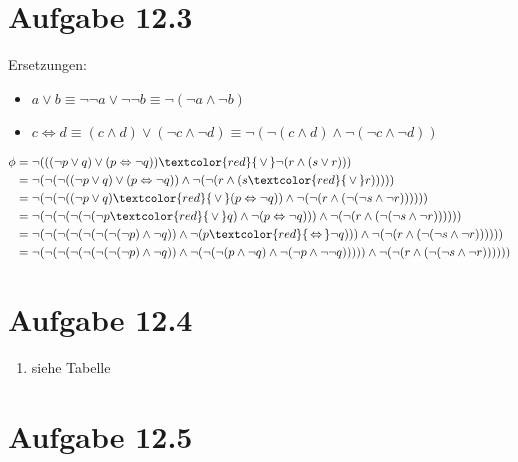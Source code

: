 \documentclass{article}
\begin{document}
	\section*{Aufgabe 12.3}
	Ersetzungen:
	\begin{itemize}
		\item $a\lor b\equiv \neg\neg a\lor\neg\neg b\equiv\neg(\neg a\land\neg b)$
		\item $c\Leftrightarrow d\equiv (c\land d)\lor(\neg c\land\neg d) \equiv \neg(\neg (c\land d)\land\neg (\neg c\land\neg d))$
	\end{itemize}
	\begin{align}
		\phi &= \neg(((\neg p\lor q)\lor(p\Leftrightarrow\neg q))\textcolor{red}{\,\lor\,}\neg(r\land(s\lor r))) \notag \\
		&= \neg(\neg(\neg ((\neg p\lor q)\lor(p\Leftrightarrow\neg q))\land\neg(\neg(r\land(s\textcolor{red}{\,\lor\,} r))))) \notag \\
		&= \neg(\neg(\neg ((\neg p\lor q)\textcolor{red}{\,\lor\,}(p\Leftrightarrow\neg q))\land\neg(\neg(r\land(\neg(\neg s\land\neg r)))))) \notag \\
		&= \neg(\neg(\neg (\neg(\neg (\neg p\textcolor{red}{\,\lor\,} q)\land\neg (p\Leftrightarrow\neg q)))\land\neg(\neg(r\land(\neg(\neg s\land\neg r)))))) \notag \\
		&= \neg(\neg(\neg (\neg(\neg (\neg(\neg (\neg p)\land\neg q))\land\neg (p\textcolor{red}{\,\Leftrightarrow\,}\neg q)))\land\neg(\neg(r\land(\neg(\neg s\land\neg r)))))) \notag \\
		&= \neg(\neg(\neg (\neg(\neg (\neg(\neg (\neg p)\land\neg q))\land\neg (\neg(\neg (p\land \neg q)\land\neg (\neg p\land\neg \neg q)))))\land\neg(\neg(r\land(\neg(\neg s\land\neg r)))))) \notag
	\end{align}
	
	\section*{Aufgabe 12.4}
	\begin{enumerate}[label=(\alph*)]
		\item siehe Tabelle

	\end{enumerate}

	\section*{Aufgabe 12.5}
\end{document}
